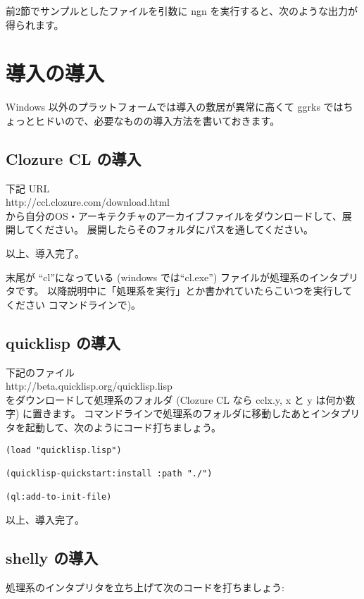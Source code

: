 \documentclass[a4j]{jsarticle}
\begin{document}
前2節でサンプルとしたファイルを引数に ngn を実行すると、次のような出力が得られます。




\section{導入の導入}
\label{install-requirements}

Windows 以外のプラットフォームでは導入の敷居が異常に高くて ggrks ではちょっとヒドいので、必要なものの導入方法を書いておきます。

\subsection{Clozure CL の導入}

下記 URL \\
http://ccl.clozure.com/download.html \\
から自分のOS・アーキテクチャのアーカイブファイルをダウンロードして、展開してください。
展開したらそのフォルダにパスを通してください。

以上、導入完了。

末尾が ``cl''になっている (windows では``cl.exe'') ファイルが処理系のインタプリタです。
以降説明中に「処理系を実行」とか書かれていたらこいつを実行してください コマンドラインで)。

\subsection{quicklisp の導入}

下記のファイル \\
http://beta.quicklisp.org/quicklisp.lisp \\
をダウンロードして処理系のフォルダ (Clozure CL なら cclx.y, x と y は何か数字) に置きます。
コマンドラインで処理系のフォルダに移動したあとインタプリタを起動して、次のようにコード打ちましょう。

\begin{lstlisting}
(load "quicklisp.lisp")

(quicklisp-quickstart:install :path "./")

(ql:add-to-init-file)
\end{lstlisting}

以上、導入完了。


\subsection{shelly の導入}
処理系のインタプリタを立ち上げて次のコードを打ちましょう:
\end{document}
